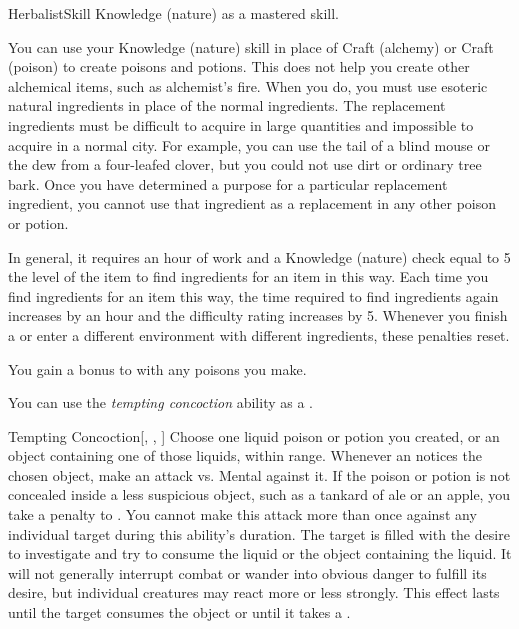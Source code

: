     \begin{feat}{Herbalist}{Skill}
        \featpre Knowledge (nature) as a mastered skill.

         You can use your Knowledge (nature) skill in place of Craft (alchemy) or Craft (poison) to create poisons and potions.
        This does not help you create other alchemical items, such as alchemist's fire.
        When you do, you must use esoteric natural ingredients in place of the normal ingredients.
        The replacement ingredients must be difficult to acquire in large quantities and impossible to acquire in a normal city.
        For example, you can use the tail of a blind mouse or the dew from a four-leafed clover, but you could not use dirt or ordinary tree bark.
        Once you have determined a purpose for a particular replacement ingredient, you cannot use that ingredient as a replacement in any other poison or potion.

        In general, it requires an hour of work and a Knowledge (nature) check equal to 5 \add the level of the item to find ingredients for an item in this way.
        Each time you find ingredients for an item this way, the time required to find ingredients again increases by an hour and the difficulty rating increases by 5.
        Whenever you finish a  or enter a different environment with different ingredients, these penalties reset.

         You gain a  bonus to  with any poisons you make.

         You can use the \textit{tempting concoction} ability as a .
        \begin{attuneability}{Tempting Concoction}[, , ]
            Choose one liquid poison or potion you created, or an object containing one of those liquids, within \rngclose range.
            Whenever an  notices the chosen object, make an attack vs. Mental against it.
            If the poison or potion is not concealed inside a less suspicious object, such as a tankard of ale or an apple, you take a  penalty to .
            You cannot make this attack more than once against any individual target during this ability's duration.
            \hit The target is filled with the desire to investigate and try to consume the liquid or the object containing the liquid.
            It will not generally interrupt combat or wander into obvious danger to fulfill its desire, but individual creatures may react more or less strongly.
            This effect lasts until the target consumes the object or until it takes a .


\end{attuneability}
\end{feat}
